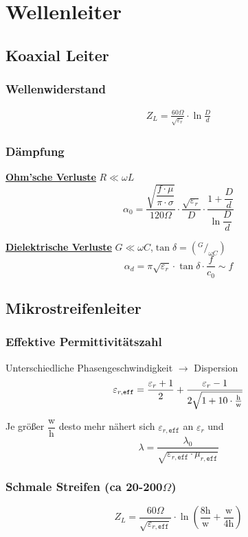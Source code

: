\section{Wellenleiter}
\subsection{Koaxial Leiter}
\subsubsection{Wellenwiderstand}


\begin{align*}
    Z_L = \frac{60\Omega}{\sqrt{\varepsilon_r}}\cdot \ln{\frac{D}{d}}
\end{align*}

\subsubsection{Dämpfung}
\underline{\textbf{Ohm'sche Verluste}} $R\ll\omega L$
\[
    \alpha_0 = \frac{\sqrt{\dfrac{f\cdot\mu}{\pi\cdot\sigma}}}{120\Omega}\cdot\frac{\sqrt{\varepsilon_r}}{D}\cdot\dfrac{1+\dfrac{D}{d}}{\ln \dfrac{D}{d}}
\]

\underline{\textbf{Dielektrische Verluste}} $G\ll\omega C$,$\tan\delta= (^G/_{\omega C})$
\[
    \alpha_d = \pi\sqrt{\varepsilon_r}\cdot\tan\delta\cdot\frac{f}{c_0} \sim f
\]

\subsection{Mikrostreifenleiter}

\subsubsection{Effektive Permittivitätszahl}
Unterschiedliche Phasengeschwindigkeit $\rightarrow$ Dispersion
\[
         \varepsilon_{r,\texttt{eff}}  = \frac{\varepsilon_r+1}{2}+\frac{\varepsilon_r-1}{2\sqrt{1+10\cdot\frac{\text{h}}{\text{w}}}} \\
\]

Je größer $\dfrac{\mathrm{w}}{\mathrm{h}}$ desto mehr nähert sich $\varepsilon_{r,\texttt{eff}}$ an $\varepsilon_r$ und 
\[
    \lambda = \frac{\lambda_0}{\sqrt{\varepsilon_{r,\texttt{eff}}\cdot\mu_{r,\texttt{eff}}}}
\]

\subsubsection[Schmale Streifen]{Schmale Streifen (ca 20-200$\Omega$)}
\[
    Z_L = \frac{60\Omega}{\sqrt{\varepsilon_{r,\texttt{eff}}}}\cdot\ln\left(\frac{8\mathrm{h}}{\mathrm{w}}+\frac{\mathrm{w}}{4\mathrm{h}}\right)
\]
